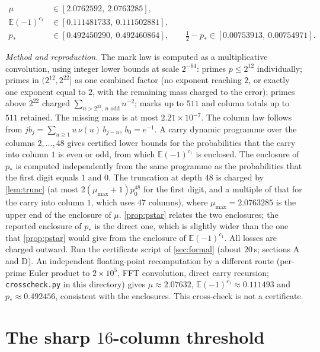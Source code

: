 \documentclass[11pt]{article}
\newcommand{\Ex}{\mathbb E}
\begin{document}
\begin{theorem}\label{thm:constants}
\begin{align*}
\mu&\in[2.0762592,\ 2.0763285],\\
\Ex(-1)^{c_1}&\in[0.111481733,\ 0.111502881],\\
p_*&\in[0.492450290,\ 0.492460864],\qquad \tfrac12-p_*\in[0.00753913,\ 0.00754971].
\end{align*}
\end{theorem}
\emph{Method and reproduction.} The mark law is computed as a multiplicative convolution, using integer lower bounds at scale $2^{-64}$: primes $p\le2^{12}$ individually; primes in $(2^{12},2^{22}]$ as one combined factor (no exponent reaching $2$, or exactly one exponent equal to $2$, with the remaining mass charged to the error); primes above $2^{22}$ charged $\sum_{n>2^{22},\,n\text{ odd}}n^{-2}$; marks up to $511$ and column totals up to $511$ retained. The missing mass is at most $2.21\times10^{-7}$. The column law follows from $jb_j=\sum_{u\ge1}u\,\nu(u)\,b_{j-u}$, $b_0=e^{-1}$. A carry dynamic programme over the columns $2,\dots,48$ gives certified lower bounds for the probabilities that the carry into column $1$ is even or odd, from which $\Ex(-1)^{c_1}$ is enclosed. The enclosure of $p_*$ is computed independently from the same programme as the probabilities that the first digit equals $1$ and $0$. The truncation at depth $48$ is charged by \cref{lem:trunc} (at most $2(\mu_{\max}+1)p_0^{48}$ for the first digit, and a multiple of that for the carry into column $1$, which uses $47$ columns), where $\mu_{\max}=2.0763285$ is the upper end of the enclosure of $\mu$. \cref{prop:pstar} relates the two enclosures; the reported enclosure of $p_*$ is the direct one, which is slightly wider than the one that \cref{prop:pstar} would give from the enclosure of $\Ex(-1)^{c_1}$. All losses are charged outward. Run the certificate script of \cref{sec:formal} (about $20$\,s; sections A and D). An independent floating-point recomputation by a different route (per-prime Euler product to $2\times10^5$, FFT convolution, direct carry recursion; \texttt{crosscheck.py} in this directory) gives $\mu\approx2.07632$, $\Ex(-1)^{c_1}\approx0.111493$ and $p_*\approx0.492456$, consistent with the enclosures. This cross-check is not a certificate.

\section{The sharp \texorpdfstring{$16$}{16}-column threshold}\label{sec:threshold}
\end{document}
